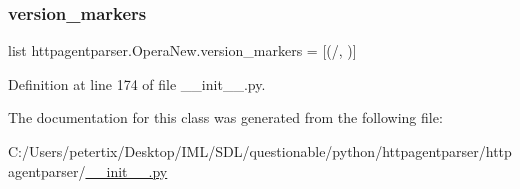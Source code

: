 \subsubsection{\texorpdfstring{version\+\_\+markers}{version\_markers}}
{\footnotesize\ttfamily list httpagentparser.\+Opera\+New.\+version\+\_\+markers = \mbox{[}(\textquotesingle{}/\textquotesingle{}, \textquotesingle{}\textquotesingle{})\mbox{]}\hspace{0.3cm}{\ttfamily [static]}}



Definition at line 174 of file \+\_\+\+\_\+init\+\_\+\+\_\+.\+py.



The documentation for this class was generated from the following file\+:\begin{DoxyCompactItemize}
\item 
C\+:/\+Users/petertix/\+Desktop/\+I\+M\+L/\+S\+D\+L/questionable/python/httpagentparser/httpagentparser/\hyperlink{____init_____8py}{\+\_\+\+\_\+init\+\_\+\+\_\+.\+py}\end{DoxyCompactItemize}
